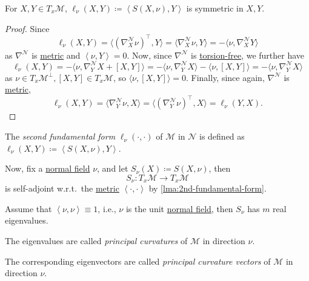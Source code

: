 \begin{lemma}\label{lma:2nd-fundamental-form}
	For \(X, Y\in T_x \mathcal{M} \), \(\ell _\nu (X, Y) \coloneqq \left\langle S(X, \nu) , Y\right\rangle \) is symmetric in \(X, Y\).
\end{lemma}
\begin{proof}
	Since
	\[
		\ell _\nu (X, Y)
		= \langle (\nabla ^\mathcal{N} _X \nu )^{\top}, Y \rangle
		= \langle \nabla _X^{\mathcal{N} } \nu , Y \rangle
		= - \langle \nu , \nabla ^\mathcal{N} _X Y \rangle
	\]
	as \(\nabla ^\mathcal{N} \) is \hyperref[def:Riemannian]{metric} and \(\left\langle \nu , Y \right\rangle=0 \). Now, since \(\nabla ^\mathcal{N} \) is \hyperref[def:torsion-free]{torsion-free}, we further have
	\[
		\ell _\nu (X, Y)
		= - \langle \nu , \nabla ^\mathcal{N} _Y X + [X, Y] \rangle
		= - \langle \nu , \nabla ^\mathcal{N} _Y X \rangle - \langle \nu , [X, Y] \rangle
		= - \langle \nu , \nabla ^\mathcal{N} _Y X \rangle
	\]
	as \(\nu \in T_x \mathcal{M} ^{\perp}, [X, Y]\in T_x \mathcal{M}\), so \(\langle \nu , [X, Y] \rangle=0\). Finally, since again, \(\nabla ^\mathcal{N} \) is \hyperref[def:Riemannian]{metric},
	\[
		\ell _\nu (X, Y)
		= \langle \nabla _Y^{\mathcal{N} } \nu , X \rangle
		= \langle (\nabla _Y^{\mathcal{N} } \nu)^{\top} , X \rangle
		= \ell _\nu (Y, X).
	\]
\end{proof}

\begin{definition}\label{def:2nd-fundamental-form}
	The \emph{second fundamental form} \(\ell _\nu (\cdot, \cdot)\) of \(\mathcal{M} \) in \(\mathcal{N} \) is defined as \(\ell _\nu (X, Y) \coloneqq \left\langle S(X, \nu ), Y \right\rangle \).
\end{definition}

Now, fix a \hyperref[not:normal-bundle]{normal field} \(\nu \), and let \(S_\nu (X) \coloneqq S(X, \nu )\), then
\[
	S_\nu \colon T_x \mathcal{M} \to T_x \mathcal{M}
\]
is self-adjoint w.r.t.\ the \hyperref[def:Riemannian-metric]{metric} \(\left\langle \cdot, \cdot \right\rangle \) by \autoref{lma:2nd-fundamental-form}.

\begin{definition*}
	Assume that \(\left\langle \nu , \nu \right\rangle \equiv 1\), i.e., \(\nu \) is the unit \hyperref[not:normal-bundle]{normal field}, then \(S_\nu \) has \(m\) real eigenvalues.

	\begin{definition}\label{def:principal-curvature}
		The eigenvalues are called \emph{principal curvatures} of \(\mathcal{M} \) in direction \(\nu \).
	\end{definition}

	\begin{definition}\label{def:principal-curvature-vector}
		The corresponding eigenvectors are called \emph{principal curvature vectors} of \(\mathcal{M} \) in direction \(\nu \).
	\end{definition}
\end{definition*}


